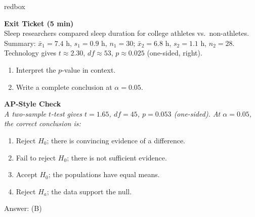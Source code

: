 \documentclass[10pt]{article}
\begin{document}
\begin{skillbox}{redbox}
\begin{minipage}[t]{0.48\linewidth}
    \textbf{Exit Ticket (5 min)}\\
    Sleep researchers compared sleep duration for college athletes vs.\ non-athletes.
    Summary: $\bar x_1 = 7.4$ h, $s_1 = 0.9$ h, $n_1 = 30$;
    $\bar x_2 = 6.8$ h, $s_2 = 1.1$ h, $n_2 = 28$. Technology gives $t \approx 2.30$,
    $df \approx 53$, $p \approx 0.025$ (one-sided, right).
    \begin{enumerate}
        \item Interpret the $p$-value in context.
        \item Write a complete conclusion at $\alpha = 0.05$.
    \end{enumerate}
\end{minipage}
\hfill
\begin{minipage}[t]{0.48\linewidth}
    \textbf{AP-Style Check}\\
    \textit{A two-sample $t$-test gives $t = 1.65$, $df = 45$, $p = 0.053$ (one-sided).
    At $\alpha = 0.05$, the correct conclusion is:}
    \begin{enumerate}[label=(\Alph*)]
        \item Reject $H_0$; there is convincing evidence of a difference.
        \item Fail to reject $H_0$; there is not sufficient evidence.
        \item Accept $H_0$; the populations have equal means.
        \item Reject $H_a$; the data support the null.
    \end{enumerate}
    Answer: (B)
\end{minipage}
\end{skillbox}
\end{document}
